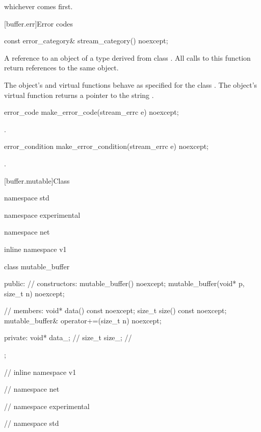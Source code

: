 whichever comes first.




%
[buffer.err]{Error codes}

%
\begin{itemdecl}
const error_category& stream_category() noexcept;
\end{itemdecl}

\begin{itemdescr}
\pnum
\returns A reference to an object of a type derived from class . All calls to this function return references to the same object.

\pnum
The object's  and  virtual functions behave as specified for the class . The object's  virtual function returns a pointer to the string .
\end{itemdescr}

%
\begin{itemdecl}
error_code make_error_code(stream_errc e) noexcept;
\end{itemdecl}

\begin{itemdescr}
\pnum
\returns {}.
\end{itemdescr}

%
\begin{itemdecl}
error_condition make_error_condition(stream_errc e) noexcept;
\end{itemdecl}

\begin{itemdescr}
\pnum
\returns {}.
\end{itemdescr}



[buffer.mutable]{Class }

%
\begin{codeblock}
namespace std {
namespace experimental {
namespace net {
inline namespace v1 {

  class mutable_buffer
  {
  public:
    // constructors:
    mutable_buffer() noexcept;
    mutable_buffer(void* p, size_t n) noexcept;

    // members:
    void* data() const noexcept;
    size_t size() const noexcept;
    mutable_buffer& operator+=(size_t n) noexcept;

  private:
    void* data_; // \expos
    size_t size_; // \expos
  };

} // inline namespace v1
} // namespace net
} // namespace experimental
} // namespace std
\end{codeblock}

